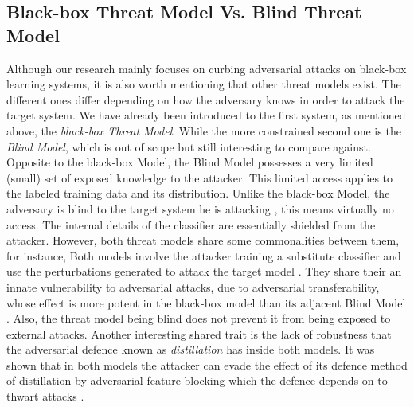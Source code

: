 \documentclass[grad,lot,lof,11pt,oneside,onehalfspace]{RUthesis}
\begin{document}
\subsection{Black-box Threat Model Vs. Blind Threat Model}
Although our research mainly focuses on curbing adversarial attacks on black-box learning systems, it is also worth mentioning that other threat models exist. The different ones differ depending on how the adversary knows in order to attack the target system. We have already been introduced to the first system, as mentioned above, the \textit{black-box Threat Model}. While the more constrained second one is the \textit{Blind Model}, which is out of scope but still interesting to compare against. \\
Opposite to the black-box Model, the Blind Model possesses a very limited (small) set of exposed knowledge to the attacker. This limited access applies to the labeled training data and its distribution. Unlike the black-box Model, the adversary is blind to the target system he is attacking \cite{hosseini_blocking_2017}, this means virtually no access. The internal details of the classifier are essentially shielded from the attacker.  However, both threat models share some commonalities between them, for instance, Both models involve the attacker training a substitute classifier and use the perturbations generated to attack the target model \cite{hosseini_blocking_2017}. They share their an innate vulnerability to adversarial attacks, due to adversarial transferability, whose effect is more potent in the black-box model than its adjacent Blind Model \cite{hosseini_blocking_2017}. Also, the threat model being blind does not prevent it from being exposed to external attacks. Another interesting shared trait is the lack of robustness that the adversarial defence known as \textit{distillation} \cite{papernot_distillation_2016} has inside both models. It was shown that in both models the attacker can evade the effect of its defence method of distillation by adversarial feature blocking which the defence depends on to thwart attacks \cite{carlini_adversarial_2017}.
\end{document}
